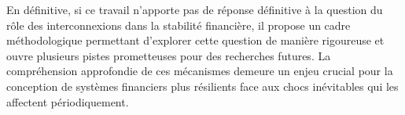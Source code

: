 En définitive, si ce travail n'apporte pas de réponse définitive à la question du rôle des interconnexions dans la stabilité financière, il propose un cadre méthodologique permettant d'explorer cette question de manière rigoureuse et ouvre plusieurs pistes prometteuses pour des recherches futures.
La compréhension approfondie de ces mécanismes demeure un enjeu crucial pour la conception de systèmes financiers plus résilients face aux chocs inévitables qui les affectent périodiquement.